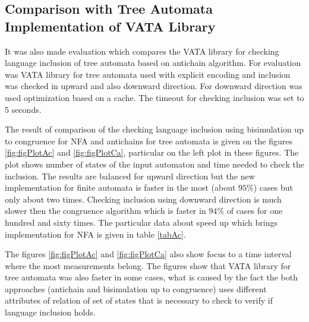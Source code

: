 \subsection{Comparison with Tree Automata Implementation of VATA Library}
It was also made evaluation which compares the VATA library for checking language inclusion of tree automata based on antichain algorithm. For evaluation was 
VATA library for tree automata used with explicit encoding and inclusion was checked in upward and also downward direction. For downward direction was used
optimization based on a cache. The timeout for checking inclusion was set to 5 seconds.

The result of comparison of the checking language inclusion using bisimulation up to congruence for NFA and antichains for tree automata 
is given on the figures \ref{fig:figPlotAc} and \ref{fig:figPlotCa}, particular on the left plot in these figures. The plot shows number of states of the input
automaton and time needed to check the inclusion. The results are balanced for upward direction but the new implementation for finite automata is faster in the
most (about $95\%$) cases but only about two times. Checking inclusion using downward direction is much slower then the congruence algorithm which is faster
in $94\%$ of cases for one hundred and sixty times. The particular data about speed up which brings implementation for NFA is given in table \ref{tabAc}.

The figures \ref{fig:figPlotAc} and \ref{fig:figPlotCa} also show
focus to a time interval where the most measurements belong. The figures show that VATA library for tree automata was
also faster in some cases, what is caused by the fact the both approaches (antichain and bisimulation up to congruence) uses different attributes of relation
of set of states that is necessary to check to verify if language inclusion holds.

